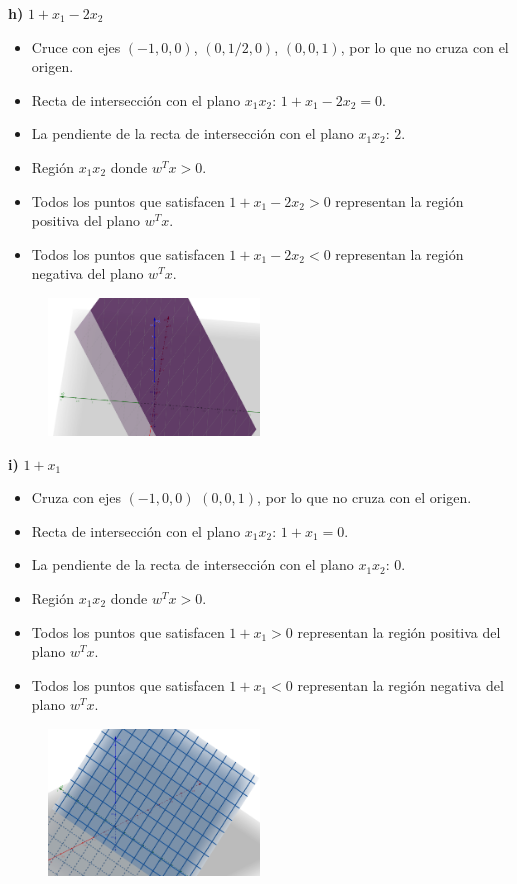 \documentclass{article}
\begin{document}
\textbf{h) } $1 + x_1 - 2x_2$  
\begin{itemize}
    \item Cruce con ejes $(-1, 0, 0)$, $(0, 1/2, 0)$, $(0, 0, 1)$, por lo que no cruza con el origen.
    \item Recta de intersección con el plano $x_1x_2$: $1 + x_1 - 2x_2 = 0$.
    \item La pendiente de la recta de intersección con el plano $x_1x_2$: $2$.
    \item Región $x_1x_2$ donde $w^T x > 0$.
    \item Todos los puntos que satisfacen $1 + x_1 - 2x_2 > 0$ representan la región positiva del plano $w^T x$.
    \item Todos los puntos que satisfacen $1 + x_1 - 2x_2 < 0$ representan la región negativa del plano $w^T x$.
\end{itemize}
\begin{figure}[H]
    \centering
    \includegraphics[width=0.5\textwidth]{Imagen8.png}  %
\end{figure}
\textbf{i) } $1 + x_1$  
\begin{itemize}
    \item Cruza con ejes $(-1, 0, 0)$ $(0, 0, 1)$, por lo que no cruza con el origen.
    \item Recta de intersección con el plano $x_1x_2$: $1 + x_1 = 0$.
    \item La pendiente de la recta de intersección con el plano $x_1x_2$: $0$.
    \item Región $x_1x_2$ donde $w^T x > 0$.
    \item Todos los puntos que satisfacen $1 + x_1 > 0$ representan la región positiva del plano $w^T x$.
    \item Todos los puntos que satisfacen $1 + x_1 < 0$ representan la región negativa del plano $w^T x$.
\end{itemize}
\begin{figure}[H]
    \centering
    \includegraphics[width=0.5\textwidth]{Imagen9.png}  %
\end{figure}
\end{document}
